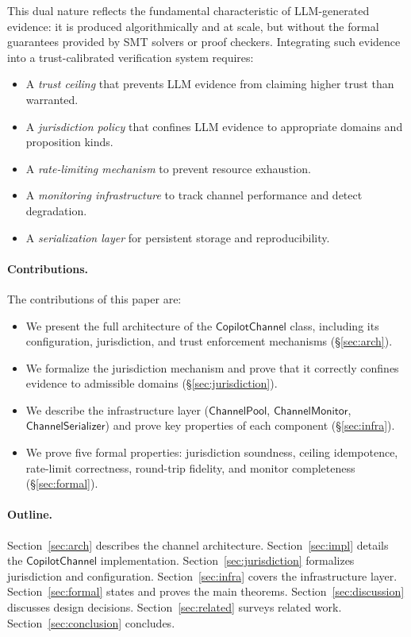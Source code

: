 \documentclass[11pt]{article}
\newcommand{\CopChan}{\mathsf{CopilotChannel}}
\newcommand{\ChanPool}{\mathsf{ChannelPool}}
\newcommand{\ChanMon}{\mathsf{ChannelMonitor}}
\newcommand{\ChanSer}{\mathsf{ChannelSerializer}}
\begin{document}
This dual nature reflects the fundamental characteristic of
LLM-generated evidence: it is produced algorithmically and at
scale, but without the formal guarantees provided by SMT solvers
or proof checkers.  Integrating such evidence into a
trust-calibrated verification system requires:

\begin{itemize}[leftmargin=2em]
\item A \emph{trust ceiling} that prevents LLM evidence from
  claiming higher trust than warranted.
\item A \emph{jurisdiction policy} that confines LLM evidence to
  appropriate domains and proposition kinds.
\item A \emph{rate-limiting mechanism} to prevent resource exhaustion.
\item A \emph{monitoring infrastructure} to track channel performance
  and detect degradation.
\item A \emph{serialization layer} for persistent storage and
  reproducibility.
\end{itemize}

\paragraph{Contributions.}
The contributions of this paper are:
\begin{itemize}[leftmargin=2em]
\item We present the full architecture of the $\CopChan$ class,
  including its configuration, jurisdiction, and trust enforcement
  mechanisms (\S\ref{sec:arch}).

\item We formalize the jurisdiction mechanism and prove that it
  correctly confines evidence to admissible domains
  (\S\ref{sec:jurisdiction}).

\item We describe the infrastructure layer ($\ChanPool$, $\ChanMon$,
  $\ChanSer$) and prove key properties of each component
  (\S\ref{sec:infra}).

\item We prove five formal properties: jurisdiction soundness,
  ceiling idempotence, rate-limit correctness, round-trip fidelity,
  and monitor completeness (\S\ref{sec:formal}).
\end{itemize}

\paragraph{Outline.}
Section~\ref{sec:arch} describes the channel architecture.
Section~\ref{sec:impl} details the $\CopChan$ implementation.
Section~\ref{sec:jurisdiction} formalizes jurisdiction and configuration.
Section~\ref{sec:infra} covers the infrastructure layer.
Section~\ref{sec:formal} states and proves the main theorems.
Section~\ref{sec:discussion} discusses design decisions.
Section~\ref{sec:related} surveys related work.
Section~\ref{sec:conclusion} concludes.
\end{document}

